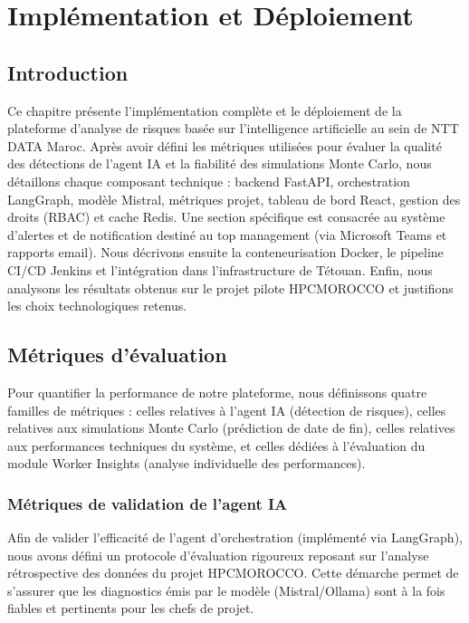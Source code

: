 \chapter{Implémentation et Déploiement}
\vspace{-1.5em}
\chaptertoc
\vspace{-2.5em}
\vspace{-0.5em}
\section{Introduction}
Ce chapitre présente l’implémentation complète et le déploiement de la plateforme d’analyse de risques basée sur l’intelligence artificielle au sein de NTT DATA Maroc. Après avoir défini les métriques utilisées pour évaluer la qualité des détections de l’agent IA et la fiabilité des simulations Monte Carlo, nous détaillons chaque composant technique : backend FastAPI, orchestration LangGraph, modèle Mistral, métriques projet, tableau de bord React, gestion des droits (RBAC) et cache Redis. Une section spécifique est consacrée au système d’alertes et de notification destiné au top management (via Microsoft Teams et rapports email). Nous décrivons ensuite la conteneurisation Docker, le pipeline CI/CD Jenkins et l’intégration dans l’infrastructure de Tétouan. Enfin, nous analysons les résultats obtenus sur le projet pilote HPCMOROCCO et justifions les choix technologiques retenus.
\vspace{-1.5em}

\section{Métriques d’évaluation}
Pour quantifier la performance de notre plateforme, nous définissons quatre familles de métriques : celles relatives à l’agent IA (détection de risques), celles relatives aux simulations Monte Carlo (prédiction de date de fin), celles relatives aux performances techniques du système, et celles dédiées à l’évaluation du module Worker Insights (analyse individuelle des performances).

\subsection{Métriques de validation de l'agent IA}

Afin de valider l'efficacité de l'agent d'orchestration (implémenté via LangGraph), nous avons défini un protocole d'évaluation rigoureux reposant sur l'analyse rétrospective des données du projet HPCMOROCCO. Cette démarche permet de s'assurer que les diagnostics émis par le modèle (Mistral/Ollama) sont à la fois fiables et pertinents pour les chefs de projet.

